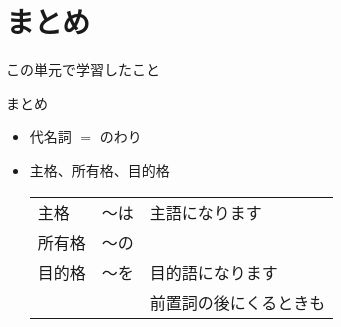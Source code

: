 \documentclass[aspectratio=169,xcolor={dvipsnames,table}]{beamer}
\begin{document}
\section{まとめ}%
\begin{frame}[plain]{この単元で学習したこと}
\begin{block}{まとめ}

 \begin{itemize}
  \item 代名詞\,\,$=$\,\,のわり
  \item 主格、所有格、目的格%
\hspace{30pt}%
\begin{tabular}[t]{lll}
 主格&〜は&主語になります \\
 所有格&〜の \\
 目的格&〜を&目的語になります \\
 & &前置詞の後にくるときも \\

\end{tabular}
 \end{itemize}

     \end{block}
\end{frame}
\end{document}
